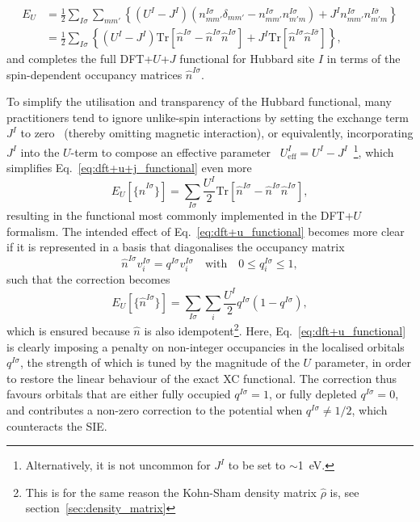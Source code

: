 {%
\begin{align}
E_U
&=\frac{1}{2}\sum_{I\sigma}\sum_{mm'}\left\{(U^I-J^I)(n^{I\sigma}_{mm'}\delta_{mm'}-n_{mm'}^{I\sigma}n_{m'm}^{I\sigma})+J^In_{mm'}^{I\sigma}n_{m'm}^{I\bar\sigma}\right\}\nonumber\\[0.5em]
&=\frac{1}{2}\sum_{I\sigma}\left\{(U^I-J^I)\mbox{Tr}\left[\hat{n}^{I\sigma}-\hat{n}^{I\sigma}\hat{n}^{I\sigma}\right]
+J^I\textrm{Tr}\left[\hat{n}^{I\sigma}\hat{n}^{I\bar\sigma}\right]\right\},
\label{eq:dft+u+j_functional}
\end{align}
%
and completes the full 
DFT+$U$+$J$ functional 
for Hubbard site $I$ 
in terms of the spin-dependent 
occupancy matrices $\hat{n}^{I\sigma}$.


To simplify the utilisation and 
transparency of the Hubbard functional, 
many practitioners tend to ignore 
unlike-spin interactions 
by setting the exchange term $J^I$ to zero~\cite{PhysRevB.79.035103} 
(thereby omitting magnetic interaction), 
or equivalently,   
incorporating $J^I$ into the $U$-term 
to compose an effective parameter~\cite{PhysRevB.57.1505,PhysRevB.71.035105,PhysRevB.79.035103} 
$U^I_\textrm{eff}=U^I-J^I$~\footnote{Alternatively, it is not uncommon
for $J^I$ to be set to $\sim$1~eV.}, 
which simplifies 
Eq.~\eqref{eq:dft+u+j_functional} 
even more 
%
\begin{equation}
E_U[\{\hat{n}^{I\sigma}\}]=\sum_{I\sigma}\frac{U^I}{2}\textrm{Tr}\left[\hat{n}^{I\sigma}-\hat{n}^{I\sigma}\hat{n}^{I\sigma}\right], 
\label{eq:dft+u_functional}
\end{equation}
%
resulting in the functional 
most commonly  
implemented in the DFT+$U$ formalism.
%
The intended effect of 
Eq.~\eqref{eq:dft+u_functional} 
becomes more clear if it 
is represented in a basis 
that diagonalises the occupancy matrix 
%
\begin{equation}
\hat{n}^{I\sigma}v^{I\sigma}_i=q^{I\sigma}v^{I\sigma}_i
\quad\mbox{with}\quad
0 \leq q_i^{I\sigma} \leq 1,
\end{equation}
such that the correction becomes
%
\begin{equation}
E_U[\{\hat{n}^{I\sigma}\}]=\sum_{I\sigma}\sum_i\frac{U^I}{2}q^{I\sigma}(1-q^{I\sigma}) 
\label{eq:dft+u_diagonal},
\end{equation}
%
which is ensured because $\hat{n}$ is also idempotent\footnote{This is for the
same reason the Kohn-Sham density matrix $\hat{\rho}$ is, see section~\ref{sec:density_matrix}}.
%
Here, Eq.~\eqref{eq:dft+u_functional} 
is clearly imposing a penalty on 
non-integer occupancies 
in the localised orbitals $q^{I\sigma}$, 
the strength of which is 
tuned by the magnitude of the 
$U$ parameter, 
in order to restore the 
linear behaviour of the 
exact XC functional.
%
The correction thus favours 
orbitals that are either 
fully occupied 
$q^{I\sigma}=1$, 
or fully depleted 
$q^{I\sigma}=0$, 
and contributes a non-zero correction 
{to the potential when $q^{I\sigma}\neq1/2$}, 
which counteracts the SIE.

}
